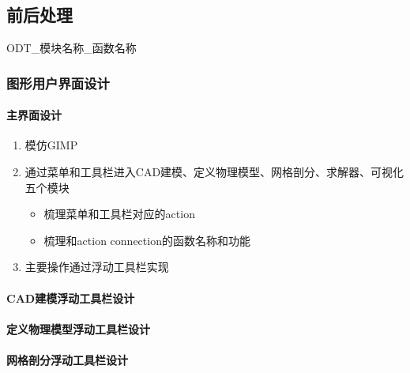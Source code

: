 \documentclass[letterpaper,10pt,english]{sphinxmanual}
\begin{document}
\subsection{前后处理}
\label{\detokenize{src/fengsim/airfoil:id1}}
\sphinxAtStartPar
ODT\_模块名称\_函数名称


\subsubsection{图形用户界面设计}
\label{\detokenize{src/fengsim/airfoil:id2}}

\paragraph{主界面设计}
\label{\detokenize{src/fengsim/airfoil:id3}}\begin{enumerate}
%
\item {} 
\sphinxAtStartPar
模仿GIMP

\item {} 
\sphinxAtStartPar
通过菜单和工具栏进入CAD建模、定义物理模型、网格剖分、求解器、可视化五个模块
\begin{itemize}
\item {} 
\sphinxAtStartPar
梳理菜单和工具栏对应的action

\item {} 
\sphinxAtStartPar
梳理和action connection的函数名称和功能

\end{itemize}

\item {} 
\sphinxAtStartPar
主要操作通过浮动工具栏实现

\end{enumerate}


\paragraph{CAD建模浮动工具栏设计}
\label{\detokenize{src/fengsim/airfoil:cad}}

\paragraph{定义物理模型浮动工具栏设计}
\label{\detokenize{src/fengsim/airfoil:id4}}

\paragraph{网格剖分浮动工具栏设计}
\label{\detokenize{src/fengsim/airfoil:id5}}
\end{document}

